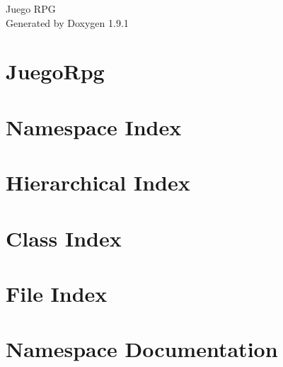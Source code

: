 \let\mypdfximage\pdfximage\def\pdfximage{\immediate\mypdfximage}\documentclass[twoside]{book}
\newcommand{\+}{\discretionary{\mbox{\scriptsize$\hookleftarrow$}}{}{}}
\newcommand{\clearemptydoublepage}{%
  \newpage{\pagestyle{empty}\cleardoublepage}%
}
\begin{document}
\raggedbottom

\hypersetup{pageanchor=false,
             bookmarksnumbered=true,
             pdfencoding=unicode
            }
\begin{titlepage}
\vspace*{7cm}
\begin{center}%
{\Large Juego RPG }\\
\vspace*{1cm}
{\large Generated by Doxygen 1.9.1}\\
\end{center}
\end{titlepage}
\clearemptydoublepage
{}
\tableofcontents
\clearemptydoublepage
{}
\hypersetup{pageanchor=true}

\chapter{Juego\+Rpg}
\label{md__r_e_a_d_m_e}

\chapter{Namespace Index}

\chapter{Hierarchical Index}

\chapter{Class Index}

\chapter{File Index}

\chapter{Namespace Documentation}








\end{document}
